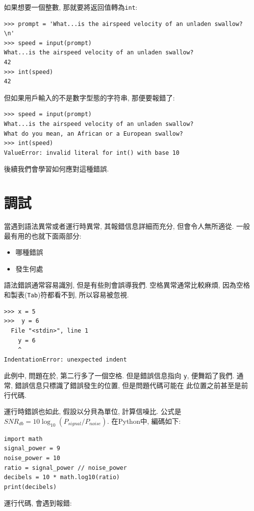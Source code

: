 \documentclass[10pt]{book}
\begin{document}
如果想要一個整數, 那就要將返回值轉為{\tt int}:

\begin{verbatim}
>>> prompt = 'What...is the airspeed velocity of an unladen swallow?\n'
>>> speed = input(prompt)
What...is the airspeed velocity of an unladen swallow?
42
>>> int(speed)
42
\end{verbatim}
%
但如果用戶輸入的不是數字型態的字符串, 那便要報錯了:

\begin{verbatim}
>>> speed = input(prompt)
What...is the airspeed velocity of an unladen swallow?
What do you mean, an African or a European swallow?
>>> int(speed)
ValueError: invalid literal for int() with base 10
\end{verbatim}
%
後續我們會學習如何應對這種錯誤. 


\section{調試}
\label{whitespace}

當遇到語法異常或者運行時異常, 其報錯信息詳細而充分, 
但會令人無所適從. 一般最有用的也就下面兩部分:

\begin{itemize}

\item 哪種錯誤

\item 發生何處

\end{itemize}

語法錯誤通常容易識別, 但是有些則會誤導我們. 
空格異常通常比較麻煩, 因為空格和製表({\tt Tab})符都看不到, 所以容易被忽視. 

\begin{verbatim}
>>> x = 5
>>>  y = 6
  File "<stdin>", line 1
    y = 6
    ^
IndentationError: unexpected indent
\end{verbatim}
%
此例中, 問題在於, 第二行多了一個空格. 
但是錯誤信息指向 {\tt y}, 便舞蹈了我們. 
通常, 錯誤信息只標識了錯誤發生的位置, 但是問題代碼可能在
此位置之前甚至是前行代碼. 

運行時錯誤也如此, 假設以分貝為單位, 計算信噪比. 
公式是$SNR_{db} = 10 \log_{10} (P_{signal} / P_{noise})$. 
在Python中, 編碼如下:

\begin{verbatim}
import math
signal_power = 9
noise_power = 10
ratio = signal_power // noise_power
decibels = 10 * math.log10(ratio)
print(decibels)
\end{verbatim}
%
運行代碼, 會遇到報錯:
%
\end{document}
